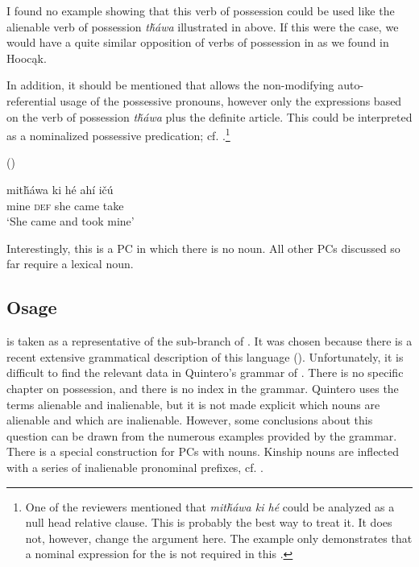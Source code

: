 \documentclass[output=paper]{LSP/langsci}
\begin{document}
 
I found no example showing that this verb of possession could be used like the alienable verb of possession \textit{t\v{h}\'awa} illustrated in  above. If this were the case, we would have a quite similar opposition of verbs of possession in  as we found in Hoocąk. 
 

In addition, it should be mentioned that  allows the non-modifying auto-referential usage of the possessive pronouns, however only the expressions based on the verb of possession \textit{t\v{h}\'awa} plus the definite article. This could be interpreted as a nominalized possessive predication; cf. .\footnote{One of the reviewers mentioned that \textit{mit\v{h}áwa ki h\'e} could be analyzed as a null head relative clause. This is probably the best way to treat it. It does not, however, change the argument here. The example only demonstrates that a nominal expression for the  is not required in this .}

\ea	{} (\citealt[22]{Buechel1939}) \label{lakotatookmine}

\gll mit\v{h}áwa ki      h\'e   ahí     i\v{c}ú \\
mine        \textsc{def} she came take \\
\glt `She came and took mine'
\z

Interestingly, this is a PC in which there is no  noun. All other PCs discussed so far require a  lexical noun.
 
\subsection{Osage}\label{sec:helmbrecht:4.5} \label{osage}

 is taken as a representative of the  sub-branch of . It was chosen because there is a recent extensive grammatical description of this language (\citealt{Quintero2004}). Unfortunately, it is difficult to find the relevant data in Quintero's grammar of . There is no specific chapter on possession, and there is no index in the grammar. Quintero uses the terms alienable and inalienable, but it is not made explicit which nouns are alienable and which are inalienable. However, some conclusions about this question can be drawn from the numerous examples provided by the grammar.
There is a special construction for PCs with   nouns. Kinship nouns are inflected with a series of inalienable pronominal prefixes, cf. .
\end{document}
